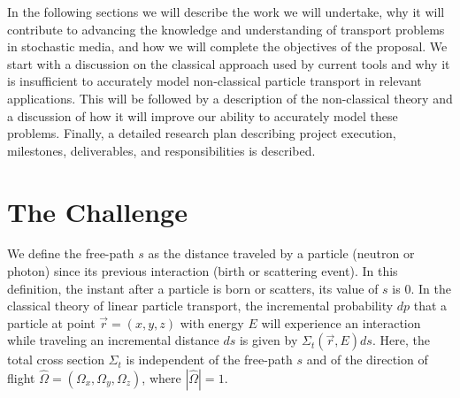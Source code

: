 \documentclass[12pt]{article}
\newcommand{\rvec}{\ensuremath{\vec{r}}}
\newcommand{\omvec}{\ensuremath{\hat{\Omega}}}
\begin{document}
In the following sections we will describe the work we will undertake, why it will contribute to advancing the knowledge and understanding of transport problems in stochastic media, and how we will complete the objectives of the proposal.
We start with a discussion on the classical approach used by current tools and why it is insufficient to accurately model non-classical particle transport in relevant applications.
This will be followed by a description of the non-classical theory and a discussion of 
how it will improve our ability to accurately model these problems.
Finally, a detailed research plan describing project execution, milestones, deliverables, and responsibilities is described.

\section{The Challenge}

We define the free-path $s$ as the distance traveled by a particle (neutron or photon) since its previous interaction (birth or scattering event).
In this definition, the instant after a particle is born or scatters, its value of $s$ is 0. 
In the classical theory of linear particle transport, the incremental probability $dp$ that a particle at point $\rvec = (x,y,z)$ with energy $E$ will experience an interaction while traveling an incremental distance $ds$ is given by $\Sigma_t(\rvec,E)ds$.
Here, the total cross section $\Sigma_t$ is independent of the free-path $s$ and of the direction of flight $\omvec = (\Omega_x,\Omega_y,\Omega_z)$, where $|\omvec|=1$.
\end{document}
